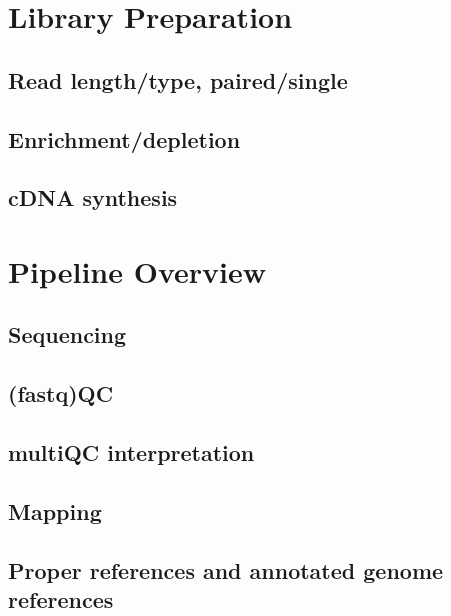 \documentclass[
]{book}
\begin{document}
\hypertarget{library-preparation}{%
\chapter{Library Preparation}\label{library-preparation}}

\hypertarget{read-lengthtype-pairedsingle}{%
\section{Read length/type, paired/single}\label{read-lengthtype-pairedsingle}}

\hypertarget{enrichmentdepletion}{%
\section{Enrichment/depletion}\label{enrichmentdepletion}}

\hypertarget{cdna-synthesis}{%
\section{cDNA synthesis}\label{cdna-synthesis}}

\hypertarget{pipeline-overview}{%
\chapter{Pipeline Overview}\label{pipeline-overview}}

\hypertarget{sequencing-1}{%
\section{Sequencing}\label{sequencing-1}}

\hypertarget{fastqqc}{%
\section{(fastq)QC}\label{fastqqc}}

\hypertarget{multiqc-interpretation}{%
\section{multiQC interpretation}\label{multiqc-interpretation}}

\hypertarget{mapping}{%
\section{Mapping}\label{mapping}}

\hypertarget{proper-references-and-annotated-genome-references}{%
\section{Proper references and annotated genome references}\label{proper-references-and-annotated-genome-references}}
\end{document}
